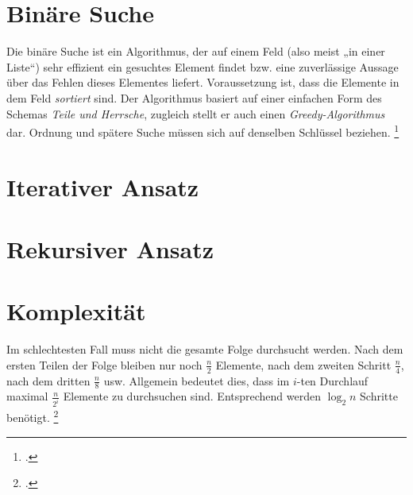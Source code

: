 \documentclass{lehramt-informatik-haupt}
\begin{document}
%

\section{Binäre Suche}

Die binäre Suche ist ein Algorithmus, der auf einem Feld (also meist „in
einer Liste“) sehr effizient ein gesuchtes Element findet bzw. eine
zuverlässige Aussage über das Fehlen dieses Elementes liefert.
Voraussetzung ist, dass die Elemente in dem Feld \emph{sortiert} sind.
Der Algorithmus basiert auf einer einfachen Form des Schemas \emph{Teile
und Herrsche}, zugleich stellt er auch einen \emph{Greedy-Algorithmus}
dar. Ordnung und spätere Suche müssen sich auf denselben Schlüssel
beziehen.
\footcite{wiki:binaere-suche}

\cite[Seite 17 (PDF 9)]{aud:fs:2}

\section{Iterativer Ansatz}


\section{Rekursiver Ansatz}


\section{Komplexität}

Im schlechtesten Fall muss nicht die gesamte Folge durchsucht werden.
Nach dem ersten Teilen der Folge bleiben nur noch $\frac{n}{2}$
Elemente, nach dem zweiten Schritt $\frac{n}{4}$, nach dem dritten
$\frac{n}{8}$ usw. Allgemein bedeutet dies, dass im $i$-ten Durchlauf
maximal $\frac{n}{2^i}$ Elemente zu durchsuchen sind. Entsprechend
werden $\log_2 n$ Schritte benötigt.
\footcite[Seite 122]{saake}

\literatur
\end{document}
